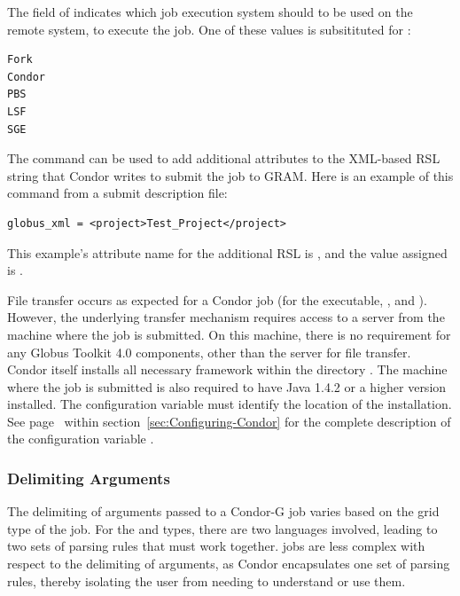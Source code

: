 The  field of 
indicates which job execution
system should to be used on the remote system, to execute the job. One of
these values is subsitituted for :
\begin{verbatim}
Fork
Condor
PBS
LSF
SGE
\end{verbatim}


The  command can be used to add additional
attributes to the XML-based RSL string that Condor writes to submit the
job to GRAM.
Here is an example of this command from a submit description file:
\begin{verbatim}
globus_xml = <project>Test_Project</project>
\end{verbatim}
This example's attribute name for the additional RSL is
, and the value assigned is .

File transfer occurs as expected for a Condor job 
(for the executable, , and ).
However, the underlying transfer mechanism requires access
to a  server from the machine where the job
is submitted.
On this machine,
there is no requirement for any Globus Toolkit 4.0 components, other than
the  server for file transfer.
Condor itself installs all necessary framework within the directory 
.
The machine where the job is submitted
is also required to
have Java 1.4.2 or a higher version installed.
The configuration variable 
must identify the location of the installation.
See page~\pageref{param:Java} within
section~\ref{sec:Configuring-Condor}
for the complete description of the configuration variable .


\subsubsection{\label{sec:CondorG-Submit-Args}Delimiting Arguments}

The delimiting of arguments passed to a Condor-G 
job varies based on the grid type of the job.
For the  and  types,
there are two languages involved, 
leading to two sets of parsing rules that must work together.
 jobs
are less complex with respect to the delimiting of arguments,
as Condor encapsulates one set of parsing rules,
thereby isolating the user from needing to understand or use them.

